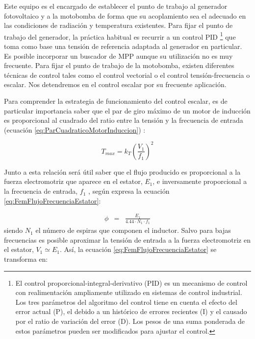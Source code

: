 Este equipo es el encargado de establecer el punto de trabajo al generador
fotovoltaico y a la motobomba de forma que su acoplamiento sea el
adecuado en las condiciones de radiación y temperatura existentes.
Para fijar el punto de trabajo del generador, la práctica habitual
es recurrir a un control PID%
\footnote{El control proporcional-integral-derivativo (PID) es un mecanismo
de control con realimentación ampliamente utilizado en sistemas de
control industrial. Los tres parámetros del algoritmo del control
tiene en cuenta el efecto del error actual (P), el debido a un histórico
de errores recientes (I) y el causado por el ratio de variación del
error (D). Los pesos de una suma ponderada de estos parámetros pueden
ser modificados para ajustar el control.%
} que toma como base una tensión de referencia adaptada al generador
en particular. Es posible incorporar un buscador de MPP aunque su
utilización no es muy frecuente. Para fijar el punto de trabajo de
la motobomba, existen diferentes técnicas de control tales como el
control vectorial o el control tensión-frecuencia o escalar. Nos detendremos
en el control escalar por su frecuente aplicación.

Para comprender la estrategia de funcionamiento del control escalar,
es de particular importancia saber que el par de giro máximo de un
motor de inducción es proporcional al cuadrado del ratio entre la
tensión y la frecuencia de entrada (ecuación \ref{eq:ParCuadraticoMotorInduccion})
\cite{FraileMora2003}:

\begin{equation}
T_{max}=k_{T}\left(\frac{V_{1}}{f_{1}}\right)^{2}\label{eq:ParCuadraticoMotorInduccion}\end{equation}


Junto a esta relación será útil saber que el flujo producido es proporcional
a la fuerza electromotriz que aparece en el estator, $E_{1}$, e inversamente
proporcional a la frecuencia de entrada, $f_{1}$ , según expresa
la ecuación \ref{eq:FemFlujoFrecuenciaEstator}:

\begin{eqnarray}
\phi & = & \frac{E_{1}}{4.44\cdot N_{1}\cdot f_{1}}\label{eq:FemFlujoFrecuenciaEstator}\end{eqnarray}
siendo $N_{1}$ el número de espiras que componen el inductor. Salvo
para bajas frecuencias es posible aproximar la tensión de entrada
a la fuerza electromotriz en el estator, $V_{1}\simeq E_{1}$. Así,
la ecuación \ref{eq:FemFlujoFrecuenciaEstator} se transforma en:

